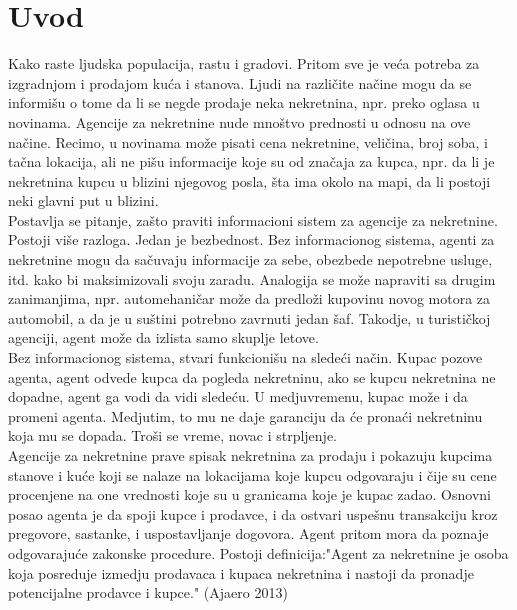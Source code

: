 \documentclass[20pt]{article}
\begin{document}
\newpage
{}
\setlength{\parindent}{1cm}
\fontsize{9}{11} \selectfont 
\tableofcontents

\newpage
\section{\bfseries \Large Uvod} 
\setlength{\parindent}{1cm}
\fontsize{13}{18} \selectfont 

\indent Kako raste ljudska populacija, rastu i gradovi. Pritom sve je ve\' ca potreba za izgradnjom i prodajom ku\' ca i stanova. Ljudi na razli\v cite na\v cine mogu da se informi\v su o tome da li se negde prodaje neka nekretnina, npr. preko oglasa u novinama. Agencije za nekretnine nude mno\v stvo prednosti u odnosu na ove na\v cine. Recimo, u novinama mo\v ze pisati cena nekretnine, veli\v cina, broj soba, i ta\v cna lokacija, ali ne pi\v su informacije koje su od zna\v caja za kupca, npr. da li je nekretnina kupcu u blizini njegovog posla, \v sta ima okolo na mapi, da li postoji neki glavni put u blizini.\\



\indent Postavlja se pitanje, za\v sto praviti informacioni sistem za agencije za nekretnine. Postoji vi\v se razloga. Jedan je bezbednost. Bez informacionog sistema, agenti za nekretnine mogu da sa\v cuvaju informacije za sebe,  obezbede nepotrebne usluge, itd. kako bi maksimizovali svoju zaradu. Analogija se mo\v ze napraviti sa drugim zanimanjima, npr. automehani\v car mo\v ze da predlo\v zi kupovinu novog motora za automobil, a da je u su\v stini potrebno zavrnuti jedan \v saf. Takodje, u turisti\v ckoj agenciji, agent mo\v ze da izlista samo skuplje letove.\\

\indent Bez informacionog sistema, stvari funkcioni\v su na slede\' ci na\v cin. Kupac pozove agenta, agent odvede kupca da pogleda nekretninu, ako se kupcu nekretnina ne dopadne, agent ga vodi da vidi slede\' cu. U medjuvremenu, kupac mo\v ze i da promeni agenta. Medjutim, to mu ne daje garanciju da \' ce prona\' ci nekretninu koja mu se dopada. Tro\v si se vreme, novac i strpljenje. \\

\indent Agencije za nekretnine prave spisak nekretnina za prodaju i pokazuju kupcima stanove i ku\' ce koji se nalaze na lokacijama koje kupcu odgovaraju i \v cije su cene procenjene na one vrednosti koje su u granicama koje je kupac zadao. Osnovni posao agenta je da spoji kupce i prodavce, i da ostvari uspe\v snu transakciju kroz pregovore, sastanke, i uspostavljanje dogovora. Agent pritom mora da poznaje odgovaraju\' ce zakonske procedure. Postoji definicija:"Agent za nekretnine je osoba koja posreduje izmedju prodavaca i kupaca nekretnina i nastoji da pronadje potencijalne prodavce i kupce." (Ajaero 2013)\\
\end{document}
